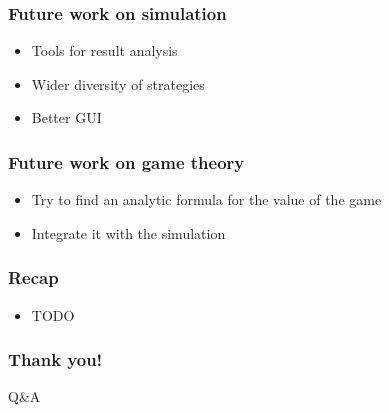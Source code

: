\documentclass{beamer}
\begin{document}
\begin{frame}
\frametitle{Future work on simulation}
\begin{itemize}
	\item Tools for result analysis
	\item Wider diversity of strategies
	\item Better GUI
\end{itemize}
\end{frame}

\begin{frame}
\frametitle{Future work on game theory}
\begin{itemize}
	\item Try to find an analytic formula for the value of the game
	\item Integrate it with the simulation
\end{itemize}
\end{frame}

\begin{frame}
\frametitle{Recap}

\begin{itemize}
	\item TODO
\end{itemize}

\end{frame}


\begin{frame}
\frametitle{Thank you!}

\huge
\centering Q\&A

\end{frame}

\end{document}
